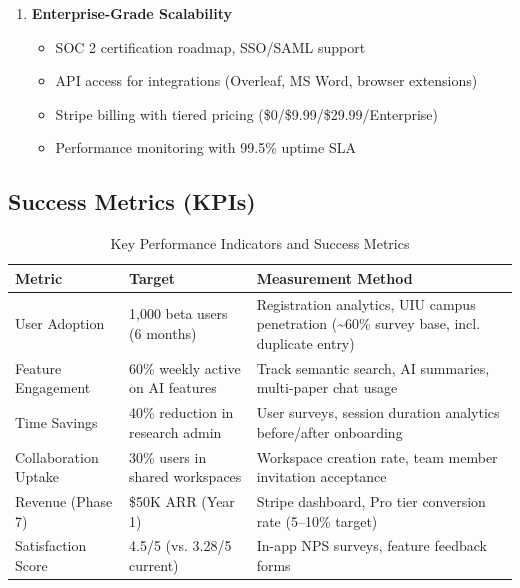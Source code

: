 \begin{enumerate}
    \item \textbf{Enterprise-Grade Scalability}
          \begin{itemize}
              \item SOC 2 certification roadmap, SSO/SAML support
              \item API access for integrations (Overleaf, MS Word, browser extensions)
              \item Stripe billing with tiered pricing (\$0/\$9.99/\$29.99/Enterprise)
              \item Performance monitoring with 99.5\% uptime SLA
          \end{itemize}
\end{enumerate}

\subsection{Success Metrics (KPIs)}

\begin{table}[H]
    \centering
    \small
    \begin{tabular}{|l|p{4cm}|p{6cm}|}
        \hline
        \textbf{Metric}                   & \textbf{Target} & \textbf{Measurement Method}                         \\
        \hline
        User Adoption                     &
        1,000 beta users (6 months)       &
        Registration analytics, UIU campus penetration (\textasciitilde{}60\% survey base, incl. duplicate entry) \\
        \hline
        Feature Engagement                &
        60\% weekly active on AI features &
        Track semantic search, AI summaries, multi-paper chat usage                                               \\
        \hline
        Time Savings                      &
        40\% reduction in research admin  &
        User surveys, session duration analytics before/after onboarding                                          \\
        \hline
        Collaboration Uptake              &
        30\% users in shared workspaces   &
        Workspace creation rate, team member invitation acceptance                                                \\
        \hline
        Revenue (Phase 7)                 &
        \$50K ARR (Year 1)                &
        Stripe dashboard, Pro tier conversion rate (5--10\% target)                                               \\
        \hline
        Satisfaction Score                &
        4.5/5 (vs. 3.28/5 current)        &
        In-app NPS surveys, feature feedback forms                                                                \\
        \hline
    \end{tabular}
    \caption{Key Performance Indicators and Success Metrics}
    \label{table:success-metrics}
\end{table}

